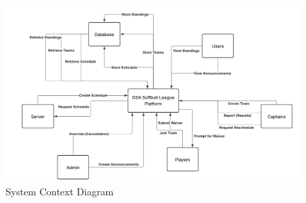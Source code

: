 \documentclass[12pt, titlepage]{article}
\begin{document}
\begin{figure}[H]
    \centering
    \includegraphics[width=\linewidth]{context_diagram.pdf}
    \caption{System Context Diagram}
    \label{fig:context_diagram}
\end{figure}
\pagebreak
\end{document}
